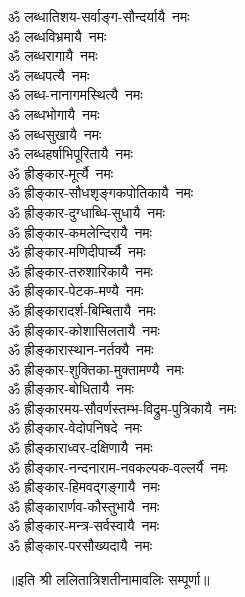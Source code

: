 \begin{multicols}{2}
\begin{flushleft}
ॐ लब्धातिशय-सर्वाङ्ग-सौन्दर्यायै~नमः\\
ॐ लब्धविभ्रमायै~नमः\\
ॐ लब्धरागायै~नमः\\
ॐ लब्धपत्यै~नमः\\
ॐ लब्ध-नानागमस्थित्यै~नमः\\
ॐ लब्धभोगायै~नमः\\
ॐ लब्धसुखायै~नमः\\
ॐ लब्धहर्षाभिपूरितायै~नमः\hfill {}\\
ॐ ह्रीङ्कार-मूर्त्यै~नमः\\
ॐ ह्रीङ्कार-सौधशृङ्गकपोतिकायै~नमः\\
ॐ ह्रीङ्कार-दुग्धाब्धि-सुधायै~नमः\\
ॐ ह्रीङ्कार-कमलेन्दिरायै~नमः\\
ॐ ह्रीङ्कार-मणिदीपार्च्यै~नमः\\
ॐ ह्रीङ्कार-तरुशारिकायै~नमः\\
ॐ ह्रीङ्कार-पेटक-मण्यै~नमः\\
ॐ ह्रीङ्कारादर्श-बिम्बितायै~नमः\\
ॐ ह्रीङ्कार-कोशासिलतायै~नमः\\
ॐ ह्रीङ्कारास्थान-नर्तक्यै~नमः\hfill {}\\
ॐ ह्रीङ्कार-शुक्तिका-मुक्तामण्यै~नमः\\
ॐ ह्रीङ्कार-बोधितायै~नमः\\
ॐ ह्रीङ्कारमय-सौवर्णस्तम्भ-विद्रुम-पुत्रिकायै~नमः\\
ॐ ह्रीङ्कार-वेदोपनिषदे~नमः\\
ॐ ह्रीङ्काराध्वर-दक्षिणायै~नमः\\
ॐ ह्रीङ्कार-नन्दनाराम-नवकल्पक-वल्लर्यै~नमः\\
ॐ ह्रीङ्कार-हिमवद्गङ्गायै~नमः\\
ॐ ह्रीङ्कारार्णव-कौस्तुभायै~नमः\\
ॐ ह्रीङ्कार-मन्त्र-सर्वस्वायै~नमः\\
ॐ ह्रीङ्कार-परसौख्यदायै~नमः\hfill {}\\
\end{flushleft}
\end{multicols}
॥इति श्री ललितात्रिशतीनामावलिः सम्पूर्णा॥
